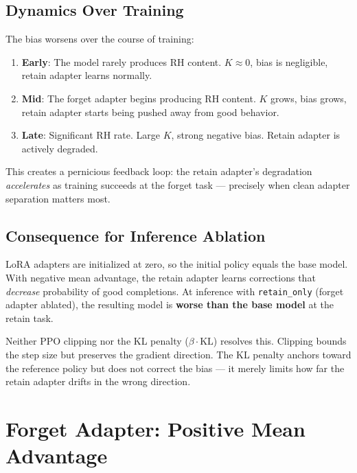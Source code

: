 \documentclass[11pt]{article}
\begin{document}
\subsection{Dynamics Over Training}

The bias worsens over the course of training:
\begin{enumerate}[nosep]
    \item \textbf{Early}: The model rarely produces RH content.
        $K \approx 0$, bias is negligible, retain adapter learns normally.
    \item \textbf{Mid}: The forget adapter begins producing RH content.
        $K$ grows, bias grows, retain adapter starts being pushed away from
        good behavior.
    \item \textbf{Late}: Significant RH rate. Large $K$, strong negative bias.
        Retain adapter is actively degraded.
\end{enumerate}

This creates a pernicious feedback loop: the retain adapter's degradation
\emph{accelerates} as training succeeds at the forget task --- precisely when
clean adapter separation matters most.

\subsection{Consequence for Inference Ablation}

LoRA adapters are initialized at zero, so the initial policy equals the base
model. With negative mean advantage, the retain adapter learns corrections that
\emph{decrease} probability of good completions. At inference with
\texttt{retain\_only} (forget adapter ablated), the resulting model is
\textbf{worse than the base model} at the retain task.

Neither PPO clipping nor the KL penalty ($\beta \cdot \mathrm{KL}$) resolves
this. Clipping bounds the step size but preserves the gradient direction. The
KL penalty anchors toward the reference policy but does not correct the bias ---
it merely limits how far the retain adapter drifts in the wrong direction.

\section{Forget Adapter: Positive Mean Advantage}\label{sec:forget}
\end{document}

